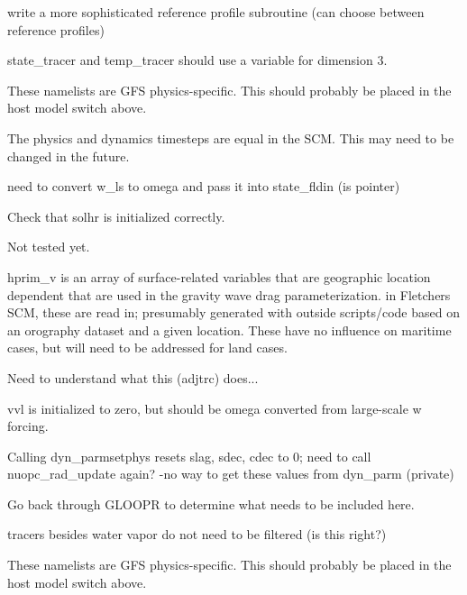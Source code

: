 
\begin{DoxyRefList}
\item[\label{todo__todo000013}%
\hypertarget{todo__todo000013}{}%
Subprogram \hyperlink{group__input_gac2f83200aaf1166b59444fcc3ec14f5c}{gmtb\+\_\+scm\+\_\+input\+:\+:get\+\_\+reference\+\_\+profile\+\_\+old} (nlev, pres, T, qv, ozone)]write a more sophisticated reference profile subroutine (can choose between reference profiles)  
\item[\label{todo__todo000001}%
\hypertarget{todo__todo000001}{}%
Subprogram \hyperlink{group___s_c_m_gaf2e62134ed0a98729f7dbc2d5753e547}{gmtb\+\_\+scm\+\_\+main\+:\+:gmtb\+\_\+scm\+\_\+main\+\_\+sub} ()]state\+\_\+tracer and temp\+\_\+tracer should use a variable for dimension 3. 

These namelists are G\+FS physics-\/specific. This should probably be placed in the host model switch above. 

The physics and dynamics timesteps are equal in the S\+CM. This may need to be changed in the future. 

need to convert w\+\_\+ls to omega and pass it into state\+\_\+fldin (is pointer) 

Check that solhr is initialized correctly. 

Not tested yet. 

hprim\+\_\+v is an array of surface-\/related variables that are geographic location dependent that are used in the gravity wave drag parameterization. in Fletcher\textquotesingle{}s S\+CM, these are read in; presumably generated with outside scripts/code based on an orography dataset and a given location. These have no influence on maritime cases, but will need to be addressed for land cases. 

Need to understand what this (adjtrc) does... 

vvl is initialized to zero, but should be omega converted from large-\/scale w forcing. 

Calling dyn\+\_\+parmsetphys resets slag, sdec, cdec to 0; need to call nuopc\+\_\+rad\+\_\+update again? -\/no way to get these values from dyn\+\_\+parm (private) 

Go back through G\+L\+O\+O\+PR to determine what needs to be included here. 

tracers besides water vapor do not need to be filtered (is this right?) 

These namelists are G\+FS physics-\/specific. This should probably be placed in the host model switch above. 


\end{DoxyRefList}
